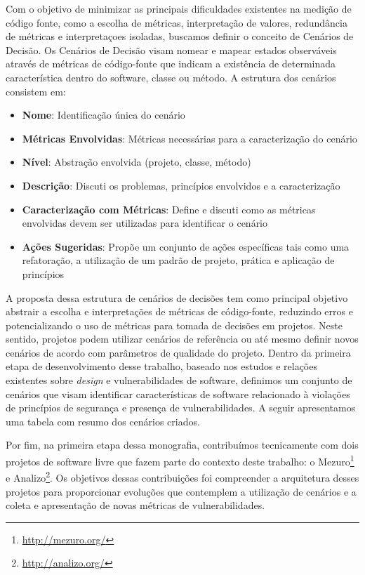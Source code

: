 Com o objetivo de minimizar as principais dificuldades existentes na medição de código fonte, como a escolha de métricas, interpretação de valores, redundância de métricas e interpretaçoes isoladas, buscamos definir o conceito de Cenários de Decisão. Os Cenários de Decisão  visam nomear e mapear estados observáveis através de métricas de código-fonte que indicam a existência de determinada característica dentro do software, classe ou método. A estrutura dos cenários consistem em:

\begin{itemize}
\item \textbf{Nome}: Identificação única do cenário
\item \textbf{Métricas Envolvidas}: Métricas necessárias para a caracterização do cenário
\item \textbf{Nível}: Abstração envolvida (projeto, classe, método)
\item \textbf{Descrição}: Discuti os problemas, princípios envolvidos e a caracterização
\item \textbf{Caracterização com Métricas}: Define e discuti como as métricas envolvidas devem ser utilizadas para identificar o cenário
\item \textbf{Ações Sugeridas}: Propõe um conjunto de ações específicas tais como uma refatoração, a utilização de um padrão de projeto, prática e aplicação de princípios
\end{itemize}

A proposta dessa estrutura de cenários de decisões tem como principal objetivo abstrair a escolha e interpretações de métricas de código-fonte, reduzindo erros e potencializando o uso de métricas para tomada de decisões em projetos. Neste sentido, projetos podem utilizar cenários de referência ou até mesmo definir novos cenários de acordo com parâmetros de qualidade do projeto. Dentro da primeira etapa de desenvolvimento desse trabalho, baseado nos estudos e relações existentes sobre \emph{design} e vulnerabilidades de software, definimos um conjunto de cenários que visam identificar características de software relacionado à violações de princípios de segurança e presença de vulnerabilidades. A seguir apresentamos uma tabela com resumo dos cenários criados.

Por fim, na primeira etapa dessa monografia, contribuímos tecnicamente com dois projetos de software livre que fazem parte do contexto deste trabalho: o Mezuro\footnote{\url{http://mezuro.org/}} e Analizo\footnote{\url{http://analizo.org/}}. Os objetivos dessas contribuições foi compreender a arquitetura desses projetos para proporcionar evoluções que contemplem a utilização de cenários e a coleta e apresentação de novas métricas de vulnerabilidades.
